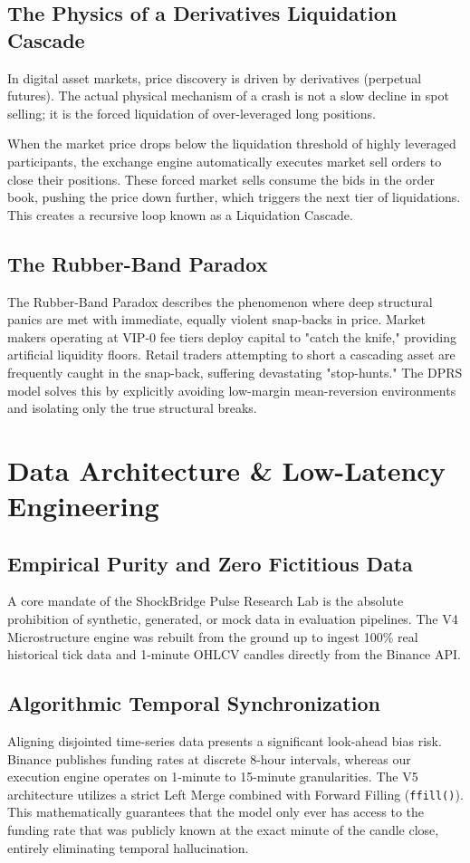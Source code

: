 \documentclass[11pt,a4paper]{report}
\begin{document}
\section{The Physics of a Derivatives Liquidation Cascade}
In digital asset markets, price discovery is driven by derivatives (perpetual futures). The actual physical mechanism of a crash is not a slow decline in spot selling; it is the forced liquidation of over-leveraged long positions. 

When the market price drops below the liquidation threshold of highly leveraged participants, the exchange engine automatically executes market sell orders to close their positions. These forced market sells consume the bids in the order book, pushing the price down further, which triggers the next tier of liquidations. This creates a recursive loop known as a Liquidation Cascade.

\section{The Rubber-Band Paradox}
The Rubber-Band Paradox describes the phenomenon where deep structural panics are met with immediate, equally violent snap-backs in price. Market makers operating at VIP-0 fee tiers deploy capital to "catch the knife," providing artificial liquidity floors. Retail traders attempting to short a cascading asset are frequently caught in the snap-back, suffering devastating "stop-hunts." The DPRS model solves this by explicitly avoiding low-margin mean-reversion environments and isolating only the true structural breaks.

\chapter{Data Architecture \& Low-Latency Engineering}
\section{Empirical Purity and Zero Fictitious Data}
A core mandate of the ShockBridge Pulse Research Lab is the absolute prohibition of synthetic, generated, or mock data in evaluation pipelines. The V4 Microstructure engine was rebuilt from the ground up to ingest 100\% real historical tick data and 1-minute OHLCV candles directly from the Binance API.

\section{Algorithmic Temporal Synchronization}
Aligning disjointed time-series data presents a significant look-ahead bias risk. Binance publishes funding rates at discrete 8-hour intervals, whereas our execution engine operates on 1-minute to 15-minute granularities. 
The V5 architecture utilizes a strict Left Merge combined with Forward Filling (\texttt{ffill()}). This mathematically guarantees that the model only ever has access to the funding rate that was publicly known at the exact minute of the candle close, entirely eliminating temporal hallucination.
\end{document}
